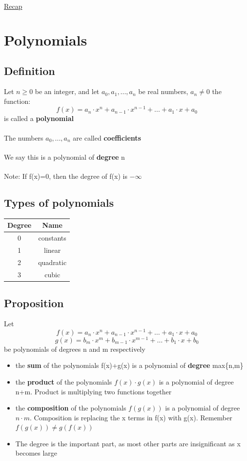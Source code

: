 \documentclass{article}[18pt]
\begin{document}
\begin{center}
\underline{\huge Recap}
\end{center}
\section{Polynomials}
\subsection{Definition}
Let $n\geqslant 0$ be an integer, and let $a_0,a_1,...,a_n$ be real numbers, $a_n\neq0$ the function:
$$f(x)=a_n\cdot x^n+a_{n-1}\cdot x^{n-1}+...+a_1\cdot x+a_0$$
is called a \textbf{polynomial}\\
\\
The numbers $a_0,...,a_n$ are called \textbf{coefficients}\\
\\
We say this is a polynomial of \textbf{degree} n\\
\\
Note: If f(x)=0, then the degree of f(x) is $-\infty$
\subsection{Types of polynomials}
\begin{tabular}{|c|c|}
	\hline 
	Degree & Name \\ 
	\hline 
	0 & constants \\ 
	\hline 
	1 & linear \\ 
	\hline 
	2 & quadratic \\ 
	\hline 
	3 & cubic \\ 
	\hline 
\end{tabular} 
\subsection{Proposition}
Let
$$f ( x ) = a _ { n } \cdot x ^ { n } + a _ { n - 1 } \cdot x ^ { n - 1 } + \ldots + a _ { 1 } \cdot x + a _ { 0 }$$
$$g ( x ) = b _ { m } \cdot x ^ { m } + b _ { m - 1 } \cdot x ^ { m - 1 } + \ldots + b _ { 1 } \cdot x + b _ { 0 }$$
be polynomials of degrees n and m respectively
\begin{itemize}
	\item the \textbf{sum} of the polynomials f(x)+g(x) is a polynomial of \textbf{degree} max\{n,m\}
	\item the \textbf{product} of the polynomials $f(x)\cdot g(x)$ is a polynomial of degree n+m. Product is multiplying two functions together
	\item the \textbf{composition} of the polynomials $f(g(x))$ is a polynomial of degree $n\cdot m$. Composition is replacing the x terms in f(x) with g(x). Remember $f(g(x))\neq g(f(x))$
	\item The degree is the important part, as most other parts are insignificant as x becomes large
\end{itemize}
\end{document}
